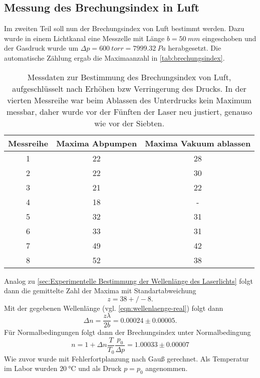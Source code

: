 \subsection{Messung des Brechungsindex in Luft}
\label{sec:Messung des Brechungsindex in Luft}
Im zweiten Teil soll nun der Brechungsindex von Luft bestimmt werden. Dazu wurde in
einem Lichtkanal eine Messzelle mit Länge $b = \SI{50}{mm}$ eingeschoben und der Gasdruck
wurde um $\Delta p = \SI{600}{torr} = \SI{7999,32}{Pa}$ herabgesetzt. Die automatische
Zählung ergab die Maximaanzahl in \autoref{tab:brechungsindex}.
\begin{table}
  \centering
  \caption{Messdaten zur Bestimmung des Brechungsindex von Luft, aufgeschlüsselt nach
  Erhöhen bzw Verringerung des Drucks. In der vierten Messreihe war beim Ablassen des
  Unterdrucks kein Maximum messbar, daher wurde vor der Fünften der Laser neu justiert,
  genauso wie vor der Siebten.}
  \label{tab:brechungsindex}
  \begin{tabular}{c c c}
  \toprule
  Messreihe & Maxima Abpumpen & Maxima Vakuum ablassen\\
  \midrule
  1 & 22 & 28 \\
  2 & 22 & 30 \\
  3 & 21 & 22 \\
  4 & 18 & -  \\
  5 & 32 & 31 \\
  6 & 33 & 31 \\
  7 & 49 & 42 \\
  8 & 52 & 38 \\
  \bottomrule
  \end{tabular}
\end{table}
Analog zu \autoref{sec:Experimentelle Bestimmung der Wellenlänge des Laserlichts} folgt
dann die gemittelte Zahl der Maxima mit Standartabweichung
\[
	z = 38+/-8.
\]
Mit der gegebenen Wellenlänge (vgl. \autoref{eqn:wellenlaenge-real}) folgt dann
\begin{equation}
	\Delta n = \frac{z \lambda}{2b} = 0.00024 \pm 0.00005.
\end{equation}
Für Normalbedingungen folgt dann der Brechungsindex unter Normalbedingung
\begin{equation}
	n = 1 + \Delta n \frac{T}{T_0} \frac{p_0}{\Delta p} = 1.00033 \pm 0.00007
\end{equation}
Wie zuvor wurde mit Fehlerfortplanzung nach Gauß gerechnet. Als Temperatur im Labor 
wurden $\SI{20}{\celsius}$ und als Druck $p = p_0$ angenommen.
